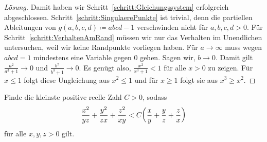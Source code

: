 \begin{proof}[Lösung]
	Damit haben wir Schritt~\ref{schritt:Gleichungssystem} erfolgreich abgeschlossen. Schritt~\ref{schritt:SingulaerePunkte} ist trivial, denn die partiellen Ableitungen von $g(a,b,c,d)\coloneqq abcd-1$ verschwinden nicht für $a,b,c,d>0$. Für Schritt~\ref{schritt:VerhaltenAmRand} müssen wir nur das Verhalten im Unendlichen untersuchen, weil wir keine Randpunkte vorliegen haben. Für $a\rightarrow \infty$ muss wegen $abcd=1$ mindestens eine Variable gegen $0$ gehen. Sagen wir, $b\rightarrow 0$. Damit gilt $\frac{a^2}{a^3+1}\rightarrow 0$ und $\frac{b^2}{b^3+1}\rightarrow 0$. Es genügt also, $\frac{x^2}{x^3+1}< 1$ für alle $x>0$ zu zeigen. Für $x\leqslant 1$ folgt diese Ungleichung aus $x^2\leqslant 1$ und für $x\geqslant 1$ folgt sie aus $x^3\geqslant x^2$.
\end{proof}


\begin{aufgabe*}\label{aufgabe:MatBoj2014Lagrange}
	Finde die kleinste positive reelle Zahl $C>0$, sodass
	\begin{equation*}
		\frac{x^2}{yz}+\frac{y^2}{zx}+\frac{z^2}{xy}<C\parens*{\frac{x}{y}+\frac{y}{z}+\frac{z}{x}}
	\end{equation*}
	für alle $x,y,z>0$ gilt.
\end{aufgabe*}
